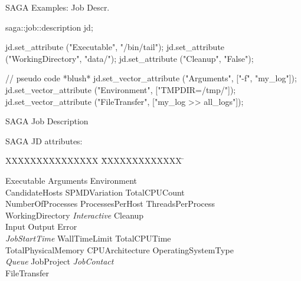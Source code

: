 \documentclass[%
  pdf,
  colorBG,
  slideColor,
  frames,
  ogf
]{prosper}
\newcommand{\I}[1]{\textit{#1}}
\begin{document}

 \begin{slide}{SAGA Examples: Job Descr.}

  \begin{mycode}[label=job description - JSDL based]

  saga::job::description jd;

  jd.set_attribute ("Executable",       "/bin/tail");
  jd.set_attribute ("WorkingDirectory", "data/");
  jd.set_attribute ("Cleanup",          "False");

  // pseudo code *blush*
  jd.set_vector_attribute ("Arguments",    ["-f", "my_log"]);
  jd.set_vector_attribute ("Environment",  ["TMPDIR=/tmp/"]);
  jd.set_vector_attribute ("FileTransfer", ["my_log >> all_logs"]);

  \end{mycode}
   
 \end{slide}


 \begin{slide}{SAGA Job Description}

  SAGA JD attributes:

  \begin{tabbing}
  XXXXXXXXXXXXXXX    \= XXXXXXXXXXXXX     \= \kill       

  Executable          \> Arguments           \> Environment         \\
  CandidateHosts      \> SPMDVariation       \> TotalCPUCount       \\
  NumberOfProcesses   \> ProcessesPerHost    \> ThreadsPerProcess   \\
  WorkingDirectory    \> \I{Interactive}     \> Cleanup             \\
  Input               \> Output              \> Error               \\
  \I{JobStartTime}    \> WallTimeLimit       \> TotalCPUTime        \\
  TotalPhysicalMemory \> CPUArchitecture     \> OperatingSystemType \\
  \I{Queue}           \> JobProject          \> \I{JobContact}      \\
  FileTransfer                                                      \\

  \end{tabbing}

 \end{slide}
\end{document}
